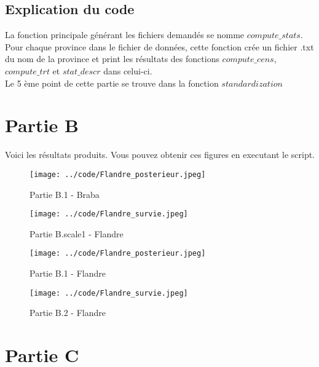 \documentclass{article}
\begin{document}
\subsection{Explication du code}

La fonction principale générant les fichiers demandés se nomme $compute\_stats$. Pour chaque province dans le fichier de données, cette fonction crée un fichier .txt du nom de la province et print les résultats des fonctions $compute\_cens$, $compute\_trt$ et $stat\_descr$ dans celui-ci. \\
Le 5 ème point de cette partie se trouve dans la fonction $standardization$

\section{Partie B}
Voici les résultats produits. Vous pouvez obtenir ces figures en executant le script.

\begin{figure}[!h]
   \begin{minipage}[c]{.46\linewidth}
	\texttt{[image: ../code/Flandre\_posterieur.jpeg]}
	\caption{Partie B.1 - Braba}
   \end{minipage} \hfill
   \begin{minipage}[c]{.46\linewidth}
	\texttt{[image: ../code/Flandre\_survie.jpeg]}
	\caption{Partie B.scale1 - Flandre}
   \end{minipage}
\end{figure}

\begin{figure}[!h]
   \begin{minipage}[c]{.46\linewidth}
	\texttt{[image: ../code/Flandre\_posterieur.jpeg]}
	\caption{Partie B.1 - Flandre}
   \end{minipage} \hfill
   \begin{minipage}[c]{.46\linewidth}
	\texttt{[image: ../code/Flandre\_survie.jpeg]}
	\caption{Partie B.2 - Flandre}
   \end{minipage}
\end{figure}

\section{Partie C}
\end{document}
